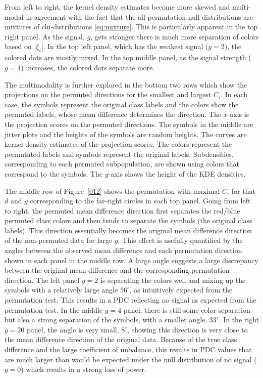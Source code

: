\documentclass[12pt]{article}
\begin{document}
{From left to right, the kernel density estimates become more skewed and multi-modal in agreement with the fact that the all permutation null distributions are mixtures of chi-distributions \eqref{eq:mixture}. This is particularly apparent in the top right panel. As the signal, $g$, gets stronger there is much more separation of colors based on $|\xi_i|$. In the top left panel, which has the weakest signal ($g=2$), the colored dots are mostly mixed. In the top middle panel, as the signal strength ($g=4$) increases, the colored dots separate more. %

The multimodality is further explored in the bottom two rows which show the projections on the permuted directions for the smallest and largest $C_i$. In each case, the symbols represent the original class labels and the colors show the permuted labels, whose mean difference determines the direction. The $x$-axis is the projection scores on the permuted directions. The symbols in the middle are jitter plots and the heights of the symbols are random heights. The curves are kernel density estimates of the projection scores. The colors represent the permutated labels and symbols represent the original labels. Subdensities, corresponding to each permuted subpopulation, are shown using colors that correspond to the symbols. 
The $y$-axis shows the height of the KDE densities.

The middle row of Figure~\ref{012} shows the permutation with maximal $C_i$ for that $d$ and $g$ corresponding to the far-right circles in each top panel. Going from left to right, the permuted mean difference direction first separates the red/blue permuted class colors and then tends to separate the symbols (the original class labels). This direction essentially becomes the original mean difference direction of the non-permuted data for large $g$. This effect is usefully quantified by the angles between the observed mean difference and each permutation direction shown in each panel in the middle row. A large angle suggests a large discrepancy between the original mean difference and the corresponding permutation direction. The left panel $g=2$ is separating the colors well and mixing up the symbols with a relatively large angle $56^{\circ}$, as intuitively expected from the permutation test. This results in a PDC reflecting no signal as expected from the permutation test. In the middle $g=4$ panel, there is still some color separation but also a strong separation of the symbols, with a smaller angle, $33^{\circ}$. In the right $g=20$ panel, the angle is very small, $8^{\circ}$, showing this direction is very close to the mean difference direction of the original data. Because of the true class difference and the large coefficient of unbalance, this results in PDC values that are much larger than would be expected under the null distribution of no signal ($g=0$) which results in a strong loss of power. 

}
\end{document}
